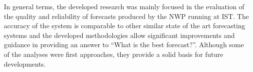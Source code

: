 \bigskip
\bigskip


In general terms, the developed research was mainly focused in the evaluation of the quality and reliability of forecasts produced by the NWP running at IST. The accuracy of the system is comparable to other similar state of the art forecasting systems and the developed methodologies allow significant improvements and guidance in providing an answer to ``What is the best forecast?''. Although some of the analyses were first approaches, they provide a solid basis for future developments.





